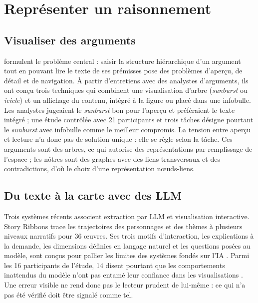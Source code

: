 \section{Représenter un raisonnement}
\label{sec:representation}

\subsection{Visualiser des arguments}

\textcite{ref09} formulent le problème central : saisir la structure hiérarchique d’un argument tout en pouvant lire le texte de ses prémisses pose des problèmes d’aperçu, de détail et de navigation. À partir d’entretiens avec des analystes d’arguments, ils ont conçu trois techniques qui combinent une visualisation d’arbre (\emph{sunburst} ou \emph{icicle}) et un affichage du contenu, intégré à la figure ou placé dans une infobulle. Les analystes jugeaient le \emph{sunburst} bon pour l’aperçu et préféraient le texte intégré ; une étude contrôlée avec 21 participants et trois tâches désigne pourtant le \emph{sunburst} avec infobulle comme le meilleur compromis. La tension entre aperçu et lecture n’a donc pas de solution unique : elle se règle selon la tâche. Ces arguments sont des arbres, ce qui autorise des représentations par remplissage de l’espace ; les nôtres sont des graphes avec des liens transversaux et des contradictions, d’où le choix d’une représentation nœuds-liens.

\subsection{Du texte à la carte avec des LLM}

Trois systèmes récents associent extraction par LLM et visualisation interactive. Story Ribbons \parencite{ref01} trace les trajectoires des personnages et des thèmes à plusieurs niveaux narratifs pour 36 œuvres. Ses trois motifs d’interaction, les explications à la demande, les dimensions définies en langage naturel et les questions posées au modèle, sont conçus pour pallier les limites des systèmes fondés sur l’IA \parencite[1, 5]{ref01}. Parmi les 16 participants de l’étude, 14 disent pourtant que les comportements inattendus du modèle n’ont pas entamé leur confiance dans les visualisations \parencite[8]{ref01}. Une erreur visible ne rend donc pas le lecteur prudent de lui-même : ce qui n’a pas été vérifié doit être signalé comme tel.

